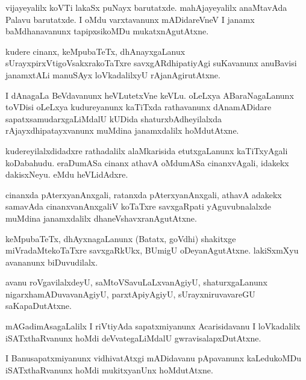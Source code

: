 \documentclass{article}
\begin{document}
\begin{mng}%
vijayeyalilx koVTi lakaSx puNayx barutatxde. mahAjayeyalilx anaMtavAda Palavu barutatxde. I oMdu 
varxtavanunx mADidareVneV I janamx baMdhanavanunx tapipxsikoMDu mukatxnAgutAtxne.
\end{mng}

\begin{mng}%
kudere cinanx, keMpubaTeTx, dhAnayxgaLanux sUrayxpirxVtigoVsakxrakoTaTxre savxgARdhipatiyAgi 
suKavanunx anuBavisi janamxtALi manuSAyx loVkadalilxyU rAjanAgirutAtxne.
\end{mng}

\begin{mng}%
I dAnagaLa BeVdavanunx heVLutetxVne keVLu. oLeLxya ABaraNagaLanunx toVDisi oLeLxya kudureyanunx 
kaTiTxda rathavanunx dAnamADidare sapatxsamudarxgaLiMdalU kUDida shaturxbAdheyilalxda 
rAjayxdhipatayxvanunx muMdina janamxdalilx hoMdutAtxne.
\end{mng}

\begin{mng}%
kudereyilalxdidadxre rathadalilx alaMkarisida etutxgaLanunx kaTiTxyAgali koDabahudu. eraDumASa 
cinanx athavA oMdumASa cinanxvAgali, idakekx dakisxNeyu. eMdu heVLidAdxre.
\end{mng}

\begin{mng}%
cinanxda pAterxyanAnxgali, ratanxda pAterxyanAnxgali, athavA adakekx samavAda cinanxvanAnxgaliV 
koTaTxre savxgaRpati yAguvubnalalxde muMdina janamxdalilx dhaneVshavxranAgutAtxne.
\end{mng}

\begin{mng}%
keMpubaTeTx, dhAyxnagaLanunx (Batatx, goVdhi) shakitxge miVradaMtekoTaTxre savxgaRkUkx, BUmigU 
oDeyanAgutAtxne. lakiSxmXyu avananunx biDuvudilalx.
\end{mng}

\begin{mng}%
avanu roVgavilalxdeyU, saMtoVSavuLaLxvanAgiyU, shaturxgaLanunx nigarxhamADuvavanAgiyU, 
parxtApiyAgiyU, sUrayxniruvavareGU saKapaDutAtxne.
\end{mng}

\begin{mng}%
mAGadimAsagaLalilx I riVtiyAda sapatxmiyanunx Acarisidavanu I loVkadalilx iSATxthaRvanunx hoMdi 
deVvategaLiMdalU gwravisalapxDutAtxne.
\end{mng}

\begin{mng}%
I Banusapatxmiyanunx vidhivatAtxgi mADidavanu pApavanunx kaLedukoMDu iSATxthaRvanunx hoMdi 
mukitxyanUnx hoMdutAtxne.
\end{mng}
\end{document}
